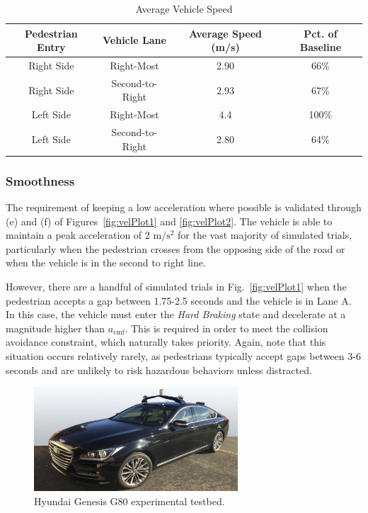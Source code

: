 \documentclass[letterpaper, 10 pt, conference]{ieeeconf}  %
\begin{document}
\begin{table}[h]
\footnotesize
\begin{center}
\caption{Average Vehicle Speed}\label{tb:speeds}
\begin{tabular}{cccc}
Pedestrian Entry & Vehicle Lane & Average Speed (m/s) & Pct. of Baseline \\\hline\hline

Right Side & Right-Most & 2.90 & 66\% \\
Right Side & Second-to-Right & 2.93 & 67\% \\
Left Side  & Right-Most & 4.4 & 100\% \\
Left Side  & Second-to-Right & 2.80 & 64\% \\\hline

\end{tabular}
\end{center}
\end{table}

\subsubsection{Smoothness}
The requirement of keeping a low acceleration where possible is validated through (e) and (f) of Figures~\ref{fig:velPlot1} and \ref{fig:velPlot2}. The vehicle is able to maintain a peak acceleration of 2 $\mathrm{m/s^2}$ for the vast majority of simulated trials, particularly when the pedestrian crosses from the opposing side of the road or when the vehicle is in the second to right line.

However, there are a handful of simulated trials in Fig.~\ref{fig:velPlot1} when the pedestrian accepts a gap between 1.75-2.5 seconds and the vehicle is in Lane A. In this case, the vehicle must enter the \textit{Hard Braking} state and decelerate at a magnitude higher than $a_\mathrm{cmf}$. This is required in order to meet the collision avoidance constraint, which naturally takes priority. Again, note that this situation occurs relatively rarely, as pedestrians typically accept gaps between 3-6 seconds and are unlikely to risk hazardous behaviors unless distracted. 

\begin{figure}[h]
\centering
\includegraphics[width=3.0in]{figures/G80.jpg}
\caption{Hyundai Genesis G80 experimental testbed.}
\label{fig:g80}
\end{figure}
\end{document}
